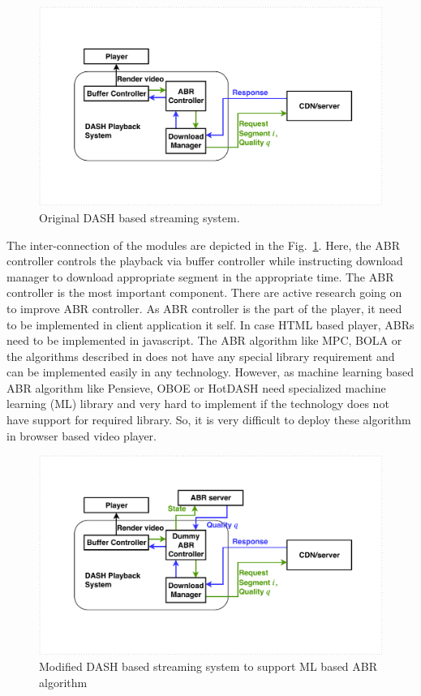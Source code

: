\begin{figure}[ht]
   \begin{center}
           \includegraphics[width=0.7\linewidth]{img/playerDiagram_basic}
   \end{center}
   \caption{\label{fig:playerDiagram_basic} Original DASH based streaming system.}
\end{figure}

The inter-connection of the modules are depicted in the Fig.~\ref{fig:playerDiagram_basic}. Here, the ABR controller controls the playback via buffer controller while instructing download manager to download appropriate segment in the appropriate time. The ABR controller is the most important component. There are active research going on to improve ABR controller. As ABR controller is the part of the player, it need to be implemented in client application it self. In case HTML based player, ABRs need to be implemented in javascript. The ABR algorithm like MPC\cite{dash:mpc}, BOLA\cite{dash:bola} or the algorithms described in \cite{dash:probe,dash:cs2p,dash:CFA,dash:rnb,dash:buffer} does not have any special library requirement and can be implemented easily in any technology. However, as machine learning based ABR algorithm like Pensieve\cite{dash:pensieve}, OBOE\cite{dash:oboe} or HotDASH\cite{dash:hotdash} need specialized machine learning (ML) library and very hard to implement if the technology does not have support for required library. So, it is very difficult to deploy these algorithm in browser based video player.

\begin{figure}[ht]
	\begin{center}
		\includegraphics[width=0.7\linewidth]{img/playerDiagram_ml}
	\end{center}
	\caption{\label{fig:playerDiagram_ml} Modified DASH based streaming system to support ML based ABR algorithm}
\end{figure}

